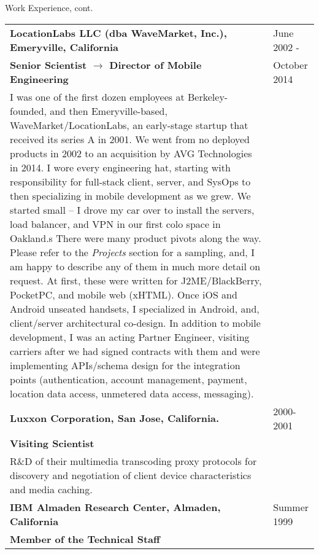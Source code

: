 \newpage
\begin{bf} \large
Work Experience, cont.
\end{bf}
\medskip

\begin{tabular}{p{5.2in}@{\hspace{1.5cm}}l}
	  
	\bf  LocationLabs LLC (dba WaveMarket, Inc.), Emeryville, California    & June 2002 -  \\
	\bf  Senior Scientist $\rightarrow$ Director of Mobile Engineering & October 2014 \\[4pt]
	
	   I was one of the first dozen employees at Berkeley-founded, and then Emeryville-based, 
	   WaveMarket/LocationLabs,
	   an early-stage startup that received its series A in 2001.
	   We went from no deployed products in 2002 to an
	   acquisition by AVG Technologies in 2014.  I wore every engineering hat, starting with responsibility
	   for full-stack client, server, and SysOps to
	   then specializing in mobile development as we grew.  
	   We started small -- 
	   I drove my car over to install the servers, load balancer, and VPN in our first colo space in Oakland.s
	   There were many product pivots along the way. Please refer to the {\it Projects} section for a sampling, 
	   and, I am happy to describe any of them in much more detail on request.
	   At first, these were written for J2ME/BlackBerry, PocketPC, and mobile web (xHTML).
	   Once iOS and Android unseated handsets, 
	   I specialized in Android, and, client/server architectural co-design.  In addition to mobile development, I was an acting
	   Partner Engineer, visiting carriers after we had signed contracts
	   with them and were implementing APIs/schema design for the integration points
	    (authentication, account management, payment, location data access, unmetered data access, messaging). \\[9pt]
       	  
    \bf Luxxon Corporation, San Jose, California. & 2000-2001 \\
    \bf Visiting Scientist  \\[4pt]

       R\&D of their multimedia transcoding proxy
       protocols for discovery and negotiation of client
       device characteristics and media caching. \\[9pt]

    \bf IBM Almaden Research Center, 
          Almaden, California                         & Summer 1999 \\
    \bf Member of the Technical Staff \\[4pt]


\end{tabular}

